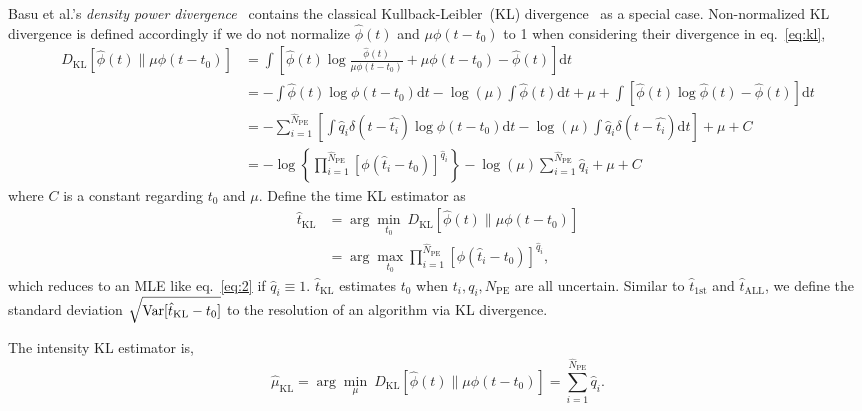Basu et al.'s \textit{density power divergence}~\cite{basu_robust_1998} contains the classical Kullback-Leibler~(KL) divergence~\cite{kullback_information_1951} as a special case.  Non-normalized KL divergence is defined accordingly if we do not normalize $\hat{\phi}(t)$ and $\mu \phi(t-t_{0})$ to 1 when considering their divergence in eq.~\eqref{eq:kl},
\begin{equation}
  \begin{aligned}
    D_\mathrm{KL}\left[\hat{\phi}(t) \parallel \mu\phi(t-t_0)\right] & =\int \left[\hat{\phi}(t) \log\frac{\hat{\phi}(t)}{\mu\phi(t-t_0)} + \mu\phi(t-t_0) - \hat{\phi}(t) \right]\mathrm{d}t \\
    & = - \int \hat{\phi}(t) \log\phi(t-t_0)\mathrm{d}t - \log(\mu)\int\hat{\phi}(t)\mathrm{d}t + \mu + \int \left[\hat{\phi}(t) \log\hat{\phi}(t) - \hat{\phi}(t) \right]\mathrm{d}t \\
    & = - \sum_{i=1}^{\hat{N}_\mathrm{PE}}\left[\int \hat{q}_i\delta(t-\hat{t_i}) \log\phi(t-t_0)\mathrm{d}t - \log(\mu)\int\hat{q}_i\delta(t-\hat{t_i})\mathrm{d}t\right] + \mu +  C \\
    & = -\log \left\{\prod_{i=1}^{\hat{N}_\mathrm{PE}} \left[\phi(\hat{t}_i-t_0)\right]^{\hat{q}_i}\right\} - \log(\mu)\sum_{i=1}^{\hat{N}_\mathrm{PE}} \hat{q}_i + \mu + C
  \label{eq:kl}
  \end{aligned}
\end{equation}
where $C$ is a constant regarding $t_0$ and $\mu$.  Define the time KL estimator as
\begin{equation}
  \begin{aligned}
  \label{eq:pseudo}
  \hat{t}_\mathrm{KL} &= \arg\underset{t_0}{\min}~D_\mathrm{KL}\left[\hat{\phi}(t) \parallel \mu\phi(t-t_0)\right] \\
  &= \arg\underset{t_0}{\max} \prod_{i=1}^{\hat{N}_\mathrm{PE}} \left[\phi(\hat{t}_i-t_0)\right]^{\hat{q}_i},
  \end{aligned}
\end{equation}
which reduces to an MLE like eq.~\eqref{eq:2} if $\hat{q}_i\equiv 1$.  $\hat{t}_\mathrm{KL}$ estimates $t_0$ when $t_i, q_i, N_\mathrm{PE}$ are all uncertain.
Similar to $\hat{t}_\mathrm{1st}$ and $\hat{t}_\mathrm{ALL}$, we define the standard deviation $\sqrt{\operatorname{Var}[\hat{t}_\mathrm{KL} - t_0]}$ to the resolution of an algorithm via KL divergence.

The intensity KL estimator is,
\begin{equation}
  \label{eq:pseudo-mu}
  \hat{\mu}_\mathrm{KL} = \arg\underset{\mu}{\min}~D_\mathrm{KL}\left[\hat{\phi}(t) \parallel \mu\phi(t-t_0)\right] = \sum_{i=1}^{\hat{N}_\mathrm{PE}} \hat{q}_i.
\end{equation}


